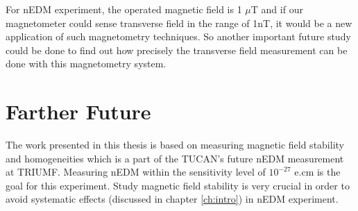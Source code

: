  For nEDM experiment, the operated magnetic field is 1 $\mu$T and if our magnetometer could sense transverse field in the range of 1nT, it would be a new application of such magnetometry techniques. So another important future study could be done to find out how precisely the transverse field measurement can be done with
  this magnetometry system. 
 



\section{Farther Future}
The work presented in this thesis is based on measuring magnetic field stability and homogeneities which is a part of the TUCAN's future nEDM measurement at TRIUMF. Measuring nEDM within the sensitivity level of $10^{-27}$ e.cm is the goal for this experiment. Study magnetic field stability is very crucial in order to avoid systematic effects (discussed in chapter \ref{ch:intro}) in nEDM experiment. %






